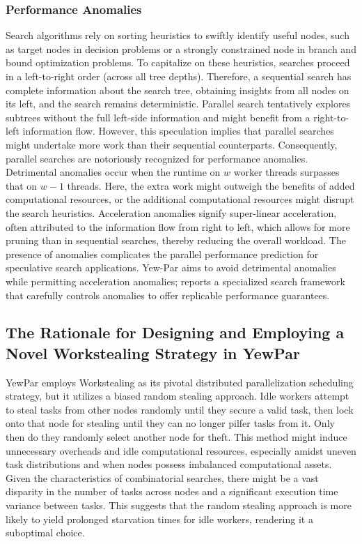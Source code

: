 \documentclass{mproj}
\begin{document}
\subsubsection{Performance Anomalies}
\label{sec:performance_anomalies}
Search algorithms rely on sorting heuristics to swiftly identify useful nodes,
such as target nodes in decision problems
or a strongly constrained node in branch and bound optimization problems.
To capitalize on these heuristics,
searches proceed in a left-to-right order (across all tree depths).
Therefore, a sequential search has complete information about the search tree,
obtaining insights from all nodes on its left, and the search remains deterministic.
Parallel search tentatively explores subtrees without the full left-side information and
might benefit from a right-to-left information flow.
However, this speculation implies that parallel searches might undertake more work
than their sequential counterparts.
Consequently, parallel searches are notoriously recognized for performance anomalies\cite{10.1007/3-540-60321-2_29}.
Detrimental anomalies occur when the runtime on \( w \) worker threads surpasses that on \( w-1 \) threads.
Here, the extra work might outweigh the benefits of added computational resources,
or the additional computational resources might disrupt the search heuristics.
Acceleration anomalies signify super-linear acceleration,
often attributed to the information flow from right to left,
which allows for more pruning than in sequential searches, thereby reducing the overall workload.
The presence of anomalies complicates the parallel performance prediction for speculative search applications.
Yew-Par aims to avoid detrimental anomalies while permitting acceleration anomalies;
\cite{ARCHIBALD201892} reports a specialized search framework that carefully controls anomalies
to offer replicable performance guarantees.

\subsection{The Rationale for Designing and Employing a Novel Workstealing Strategy in YewPar}
YewPar employs Workstealing as its pivotal distributed parallelization scheduling strategy,
but it utilizes a biased random stealing approach\cite{archibald2019yewpar}.
Idle workers attempt to steal tasks from other nodes randomly until they secure a valid task,
then lock onto that node for stealing until they can no longer pilfer tasks from it.
Only then do they randomly select another node for theft.
This method might induce unnecessary overheads and idle computational resources,
especially amidst uneven task distributions and when nodes possess imbalanced computational assets.
Given the characteristics of combinatorial searches,
there might be a vast disparity in the number of tasks across nodes and
a significant execution time variance between tasks.
This suggests that the random stealing approach is more likely to yield prolonged starvation times for idle workers,
rendering it a suboptimal choice.
\end{document}
